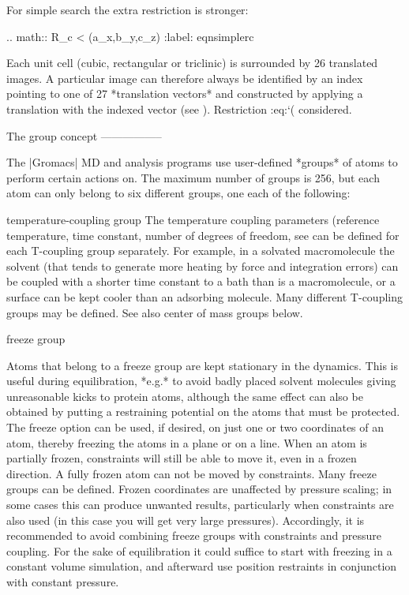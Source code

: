 For simple search the extra restriction is stronger:

.. math:: R_c < {}\min(a_x,b_y,c_z)
          :label: eqnsimplerc

Each unit cell (cubic, rectangular or triclinic) is surrounded by 26
translated images. A particular image can therefore always be identified
by an index pointing to one of 27 *translation vectors* and constructed
by applying a translation with the indexed vector (see
). Restriction
:eq:`(%
considered.

The group concept
-----------------

The |Gromacs| MD and analysis programs use
user-defined *groups* of atoms to perform certain actions on. The
maximum number of groups is 256, but each atom can only belong to six
different groups, one each of the following:

temperature-coupling group
    The temperature coupling
    parameters (reference temperature, time constant, number of degrees
    of freedom, see 
    can be defined for
    each T-coupling group separately. For example, in a solvated
    macromolecule the solvent (that tends to generate more heating by
    force and integration errors) can be coupled with a shorter time
    constant to a bath than is a macromolecule, or a surface can be kept
    cooler than an adsorbing molecule. Many different T-coupling groups
    may be defined. See also center of mass groups below.

freeze group

    Atoms that belong to a freeze group are kept stationary in the
    dynamics. This is useful during equilibration, *e.g.* to avoid badly
    placed solvent molecules giving unreasonable kicks to protein atoms,
    although the same effect can also be obtained by putting a
    restraining potential on the atoms that must be protected. The
    freeze option can be used, if desired, on just one or two
    coordinates of an atom, thereby freezing the atoms in a plane or on
    a line. When an atom is partially frozen, constraints will still be
    able to move it, even in a frozen direction. A fully frozen atom can
    not be moved by constraints. Many freeze groups can be defined.
    Frozen coordinates are unaffected by pressure scaling; in some cases
    this can produce unwanted results, particularly when constraints are
    also used (in this case you will get very large pressures).
    Accordingly, it is recommended to avoid combining freeze groups with
    constraints and pressure coupling. For the sake of equilibration it
    could suffice to start with freezing in a constant volume
    simulation, and afterward use position restraints in conjunction
    with constant pressure.

